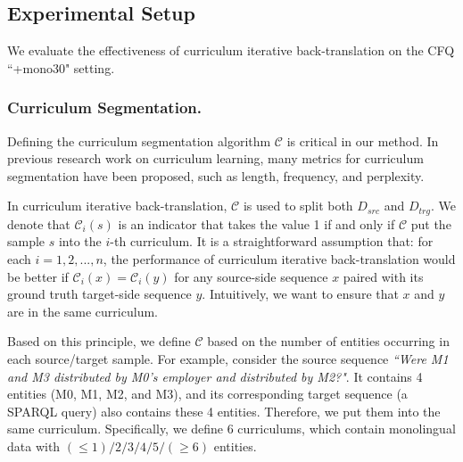 \documentclass[letterpaper]{article} %
\begin{document}
\subsection{Experimental Setup}
We evaluate the effectiveness of curriculum iterative back-translation on the CFQ ``+mono30" setting.

\subsubsection{Curriculum Segmentation.}
Defining the curriculum segmentation algorithm $\mathcal{C}$ is critical in our method.
In previous research work on curriculum learning, many metrics for curriculum segmentation have been proposed, such as length, frequency, and perplexity.

In curriculum iterative back-translation, $\mathcal{C}$ is used to split both $D_{src}$ and $D_{trg}$.
We denote that $\mathcal{C}_i(s)$ is an indicator that takes the value 1 if and only if $\mathcal{C}$ put the sample $s$ into the $i$-th curriculum.
It is a straightforward assumption that: for each $i = 1, 2, ..., n$, the performance of curriculum iterative back-translation would be better if $\mathcal{C}_i(x)=\mathcal{C}_i(y)$ for any source-side sequence $x$ paired with its ground truth target-side sequence $y$.
Intuitively, we want to ensure that $x$ and $y$ are in the same curriculum.

Based on this principle, we define $\mathcal{C}$ based on the number of entities occurring in each source/target sample.
For example, consider the source sequence \textit{``Were M1 and M3 distributed by M0's employer and distributed by M2?"}.
It contains 4 entities (M0, M1, M2, and M3), and its corresponding target sequence (a SPARQL query) also contains these 4 entities.
Therefore, we put them into the same curriculum.
Specifically, we define 6 curriculums, which contain monolingual data with $(\leq 1) / 2 / 3 / 4 / 5 / (\geq 6)$ entities.
\end{document}
